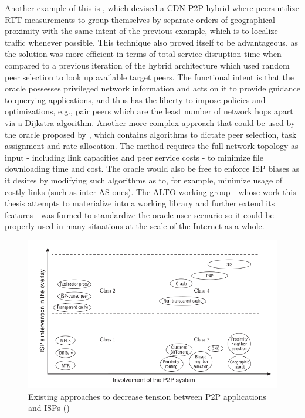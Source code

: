 \begin{itemize}
        Another example of this is \cite{kim2011}, which devised a CDN-P2P hybrid where peers utilize RTT measurements to group themselves by separate orders of geographical proximity with the same intent of the previous example, which is to localize traffic whenever possible.
        This technique also proved itself to be advantageous, as the solution was more efficient in terms of total service disruption time when compared to a previous iteration of the hybrid architecture which used random peer selection to look up available target peers.
        The functional intent is that the oracle possesses privileged network information and acts on it to provide guidance to querying applications, and thus has the liberty to impose policies and optimizations, e.g., pair peers which are the least number of network hops apart via a Dijkstra algorithm.
        Another more complex approach that could be used by the oracle proposed by \cite{han2009}, which contains algorithms to dictate peer selection, task assignment and rate allocation.
        The method requires the full network topology as input - including link capacities and peer service costs - to minimize file downloading time and cost.
        The oracle would also be free to enforce ISP biases as it desires by modifying such algorithms as to, for example, minimize usage of costly links (such as inter-AS ones).
        The ALTO working group - whose work this thesis attempts to materialize into a working library and further extend its features - was formed to standardize the oracle-user scenario so it could be properly used in many situations at the scale of the Internet as a whole.

\end{itemize}

\begin{figure}[!h]
\centering
\includegraphics[scale=0.65]{img/approaches-isp-p2p.png}
\caption{Existing approaches to decrease tension between P2P applications and ISPs (\cite{dan-Commag10})}
\label{fig:p2p-isp-interactions}
\end{figure}

